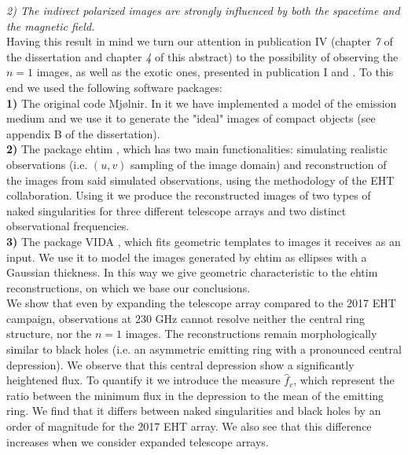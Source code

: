 \documentclass[12pt]{article}
\numberwithin{equation}{section}
\numberwithin{figure}{section}
\begin{document}
	\emph{2) The indirect polarized images are strongly influenced by both the spacetime and the magnetic field.}\\
	
	Having this result in mind we turn our attention in publication IV (chapter \emph{7} of the dissertation and chapter \emph{4} of this abstract) to the possibility of observing the $n=1$ images, as well as the exotic ones, presented in publication I and \cite{Gyulchev2020}\cite{Gyulchev2021}. To this end we used the following software packages:\\
	
	\textbf{1)} The original code Mjølnir. In it we have implemented a model of the emission medium and we use it to generate the "ideal" images of compact objects (see appendix B of the dissertation).\\
	
	\textbf{2)} The package ehtim \cite{EHTIM}, which has two main functionalities: simulating realistic observations (i.e. $(u,v)$ sampling of the image domain) and reconstruction of the images from said simulated observations, using the methodology of the EHT collaboration. Using it we produce the reconstructed images of two types of naked singularities for three different telescope arrays and two distinct observational frequencies.\\ 
	
	\textbf{3)} The package VIDA \cite{VIDA}, which fits geometric templates to images it receives as an input. We use it to model the images generated by ehtim as ellipses with a Gaussian thickness. In this way we give geometric characteristic to the ehtim reconstructions, on which we base our conclusions.\\
	
	We show that even by expanding the telescope array compared to the 2017 EHT campaign, observations at 230 GHz cannot resolve neither the central ring structure, nor the $n = 1$ images. The reconstructions remain morphologically similar to black holes (i.e. an asymmetric emitting ring with a pronounced central depression). We observe that this central depression show a significantly heightened flux. To quantify it we introduce the measure $\hat{f}_c$, which represent the ratio between the minimum flux in the depression to the mean of the emitting ring. We find that it differs between naked singularities and black holes by an order of magnitude for the 2017 EHT array. We also see that this difference increases when we consider expanded telescope arrays.\\
	
\end{document}
